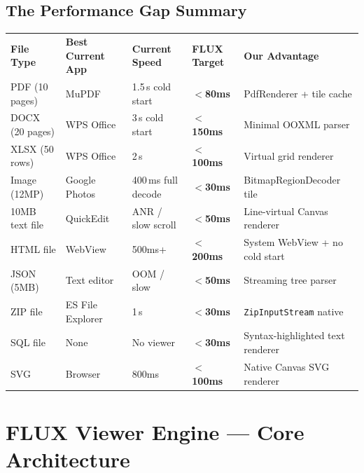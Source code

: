 \documentclass[12pt,a4paper]{report}
\newcommand{\ra}[1]{\renewcommand{\arraystretch}{#1}}
\newcommand{\THRD}[1]{\rowcolor{RD}\color{white}\bfseries #1}
\newcommand{\PB}{\newpage}
\begin{document}
\section{The Performance Gap Summary}

\begin{center}\ra{1.4}
\begin{tabular}{L{3.0cm} C{2.4cm} C{2.4cm} C{2.4cm} C{3.6cm}}
\THRD{File Type} & \THRD{Best Current App} &
\THRD{Current Speed} & \THRD{FLUX Target} & \THRD{Our Advantage} \\
 PDF (10 pages) & MuPDF & 1.5\,s cold start & \textbf{$<$80ms} & PdfRenderer + tile cache \\
 DOCX (20 pages) & WPS Office & 3\,s cold start & \textbf{$<$150ms} & Minimal OOXML parser \\
 XLSX (50 rows) & WPS Office & 2\,s & \textbf{$<$100ms} & Virtual grid renderer \\
 Image (12MP) & Google Photos & 400\,ms full decode & \textbf{$<$30ms} & BitmapRegionDecoder tile \\
 10MB text file & QuickEdit & ANR / slow scroll & \textbf{$<$50ms} & Line-virtual Canvas renderer \\
 HTML file & WebView & 500ms+ & \textbf{$<$200ms} & System WebView + no cold start \\
 JSON (5MB) & Text editor & OOM / slow & \textbf{$<$50ms} & Streaming tree parser \\
 ZIP file & ES File Explorer & 1\,s & \textbf{$<$30ms} & \texttt{ZipInputStream} native \\
 SQL file & None & No viewer & \textbf{$<$30ms} & Syntax-highlighted text renderer \\
 SVG & Browser & 800ms & \textbf{$<$100ms} & Native Canvas SVG renderer \\
\end{tabular}
\end{center}

\PB

\chapter{FLUX Viewer Engine — Core Architecture}
\end{document}
